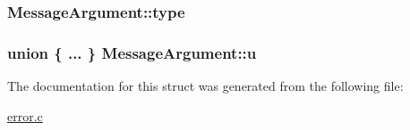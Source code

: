 \subsubsection[{type}]{ Message\+Argument\+::type}\label{struct_message_argument_ab4edae149a46b949d311508db068c999}
\hypertarget{struct_message_argument_a9ca164b976d87645797abcca00269976}{}
\subsubsection[{u}]{\setlength{\rightskip}{0pt plus 5cm}union \{ ... \}   Message\+Argument\+::u}\label{struct_message_argument_a9ca164b976d87645797abcca00269976}


The documentation for this struct was generated from the following file\+:\begin{DoxyCompactItemize}
\item 
\hyperlink{error_8c}{error.\+c}\end{DoxyCompactItemize}
